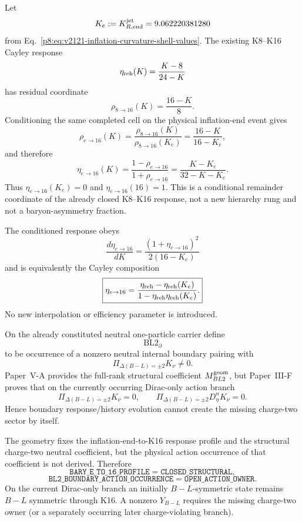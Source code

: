 \documentclass[12pt,a4paper]{article}
\begin{document}
\begin{definition}
\label{p8:def:v2137-inflation-end-conditioned-response}
Let
\[
 K_e:=K_{R,\rm end}^{\rm jet}=9.062220381280
\]
from Eq.~\eqref{p8:eq:v2121-inflation-curvature-shell-values}.  The existing
K8--K16 Cayley response
\[
 \eta_{\rm reh}(K)=\frac{K-8}{24-K}
\]
has residual coordinate
\[
 \rho_{8\to16}(K)=\frac{16-K}{8}.
\]
Conditioning the same completed cell on the physical inflation-end event gives
\[
 \rho_{e\to16}(K)
 =\frac{\rho_{8\to16}(K)}{\rho_{8\to16}(K_e)}
 =\frac{16-K}{16-K_e},
\]
and therefore
\[
 \boxed{
 \eta_{e\to16}(K)
 =\frac{1-\rho_{e\to16}}{1+\rho_{e\to16}}
 =\frac{K-K_e}{32-K-K_e}.}
\]
Thus $\eta_{e\to16}(K_e)=0$ and $\eta_{e\to16}(16)=1$.  This is a
conditional remainder coordinate of the already closed K8--K16 response, not
a new hierarchy rung and not a baryon-asymmetry fraction.
\end{definition}

\begin{corollary}
\label{p8:cor:v2137-conditioned-response-flow}
The conditioned response obeys
\[
 \boxed{
 \frac{d\eta_{e\to16}}{dK}
 =\frac{(1+\eta_{e\to16})^2}{2(16-K_e)}}
\]
and is equivalently the Cayley composition
\[
 \boxed{
 \eta_{e\to16}
 =\frac{\eta_{\rm reh}-\eta_{\rm reh}(K_e)}
 {1-\eta_{\rm reh}\eta_{\rm reh}(K_e)}.}
\]
No new interpolation or efficiency parameter is introduced.
\end{corollary}

\begin{definition}
\label{p8:def:v2137-bl2-boundary-owner}
On the already constituted neutral one-particle carrier define
\[
 \boxed{\mathrm{BL2}_{\partial}}
\]
to be occurrence of a nonzero neutral internal boundary pairing with
\[
 \Pi_{\Delta(B-L)=\pm2}K_\nu\ne0.
\]
Paper~V-A provides the full-rank structural coefficient
$M_{BL2}^{\rm geom}$, but Paper~III-F proves that on the currently occurring
Dirac-only action branch
\[
 \boxed{\Pi_{\Delta(B-L)=\pm2}K_\nu=0,}
 \qquad
 \boxed{\Pi_{\Delta(B-L)=\pm2}D_\eta^nK_\nu=0.}
\]
Hence boundary response/history evolution cannot create the missing charge-two
sector by itself.
\end{definition}

\begin{proposition}
\label{p8:prop:v2137-native-boundary-baryogenesis-status}
The geometry fixes the inflation-end-to-K16 response profile and the
structural charge-two neutral coefficient, but the physical action occurrence
of that coefficient is not derived.  Therefore
\[
 \boxed{
 \texttt{BARY\_E\_TO\_16\_PROFILE}=\texttt{CLOSED\_STRUCTURAL},}
\]
\[
 \boxed{
 \texttt{BL2\_BOUNDARY\_ACTION\_OCCURRENCE}=\texttt{OPEN\_ACTION\_OWNER}.}
\]
On the current Dirac-only branch an initially $B-L$-symmetric state remains
$B-L$ symmetric through K16.  A nonzero $Y_{B-L}$ requires the missing
charge-two owner (or a separately occurring later charge-violating branch).
\end{proposition}
\end{document}
